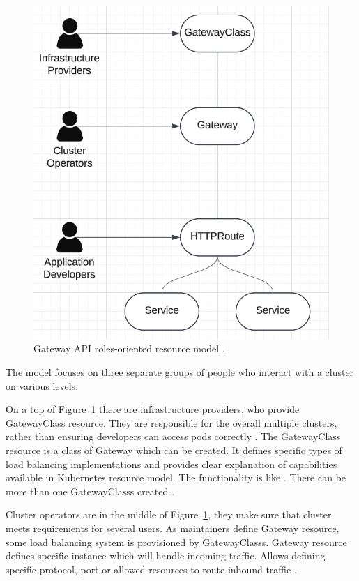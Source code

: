 \begin{figure}[tbh]
    \centering
    \includegraphics[width=0.7\columnwidth]{images/gateway-api-resource-model.png}
    \caption{Gateway API roles-oriented resource model \cite{KubernetesGatewayAPI}.}
    \label{fig:gatewayApiResourceModel}
\end{figure}

The model focuses on three separate groups of people who interact with a cluster on various levels. 

On a top of Figure~\ref{fig:gatewayApiResourceModel} there are infrastructure providers, who provide GatewayClass resource. They are responsible for the overall multiple clusters, rather than ensuring developers can access pods correctly \cite{KubernetesGatewayAPI}. The GatewayClass resource is a class of Gateway which can be created. It defines specific types of load balancing implementations and provides clear explanation of capabilities available in Kubernetes resource model. The functionality is like \textit{}. There can be more than one GatewayClasss created \cite{KubernetesGatewayAPI}. 


Cluster operators are in the middle of Figure~\ref{fig:gatewayApiResourceModel}, they make sure that cluster meets requirements for several users. As maintainers define Gateway resource, some load balancing system is provisioned by GatewayClasss. Gateway resource defines specific instance which will handle incoming traffic. Allows defining specific protocol, port or allowed resources to route inbound traffic \cite{KubernetesGatewayAPI}.


